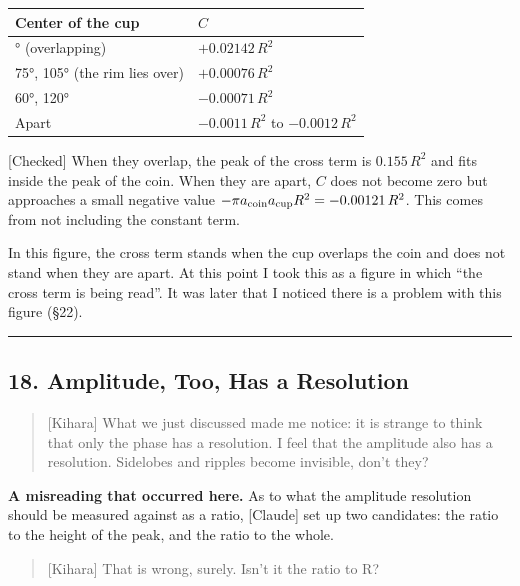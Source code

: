 \documentclass[
  a4paper,
]{article}
\newcounter{none} %
\begin{document}
{\def\LTcaptype{none} %
\begin{longtable}[]{@{}ll@{}}
\toprule\noalign{}
Center of the cup & \(C\) \\
\midrule\noalign{}
\endhead
\bottomrule\noalign{}
\endlastfoot
90° (overlapping) & \(+0.02142\,R^2\) \\
75°, 105° (the rim lies over) & \(+0.00076\,R^2\) \\
60°, 120° & \(-0.00071\,R^2\) \\
Apart & \(-0.0011\,R^2\) to \(-0.0012\,R^2\) \\
\end{longtable}
}

{[}Checked{]} When they overlap, the peak of the cross term is
\(0.155\,R^2\) and fits inside the peak of the coin. When they are
apart, \(C\) does not become zero but approaches a small negative value
\(-\pi a_{\rm coin}a_{\rm cup}R^2=-0.00121\,R^2\). This comes from not
including the constant term.

In this figure, the cross term stands when the cup overlaps the coin and
does not stand when they are apart. At this point I took this as a
figure in which ``the cross term is being read''. It was later that I
noticed there is a problem with this figure (§22).

\begin{center}\rule{0.5\linewidth}{0.5pt}\end{center}

\subsection{18. Amplitude, Too, Has a
Resolution}\label{amplitude-too-has-a-resolution}

\begin{quote}
{[}Kihara{]} What we just discussed made me notice: it is strange to
think that only the phase has a resolution. I feel that the amplitude
also has a resolution. Sidelobes and ripples become invisible, don't
they?
\end{quote}

\textbf{A misreading that occurred here.} As to what the amplitude
resolution should be measured against as a ratio, {[}Claude{]} set up
two candidates: the ratio to the height of the peak, and the ratio to
the whole.

\begin{quote}
{[}Kihara{]} That is wrong, surely. Isn't it the ratio to R?
\end{quote}
\end{document}
